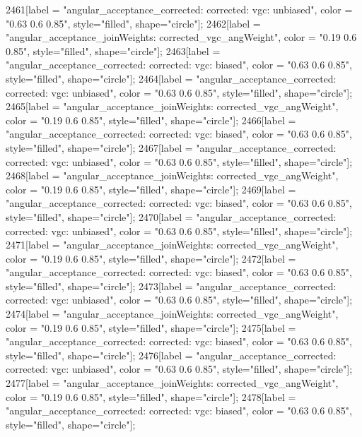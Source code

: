 {	2461[label = "angular_acceptance_corrected\nangacc: corrected\ncsp: vgc\ntrigger: unbiased", color = "0.63 0.6 0.85", style="filled", shape="circle"];
	2462[label = "angular_acceptance_joinWeights\nwflag: corrected_vgc_angWeight", color = "0.19 0.6 0.85", style="filled", shape="circle"];
	2463[label = "angular_acceptance_corrected\nangacc: corrected\ncsp: vgc\ntrigger: biased", color = "0.63 0.6 0.85", style="filled", shape="circle"];
	2464[label = "angular_acceptance_corrected\nangacc: corrected\ncsp: vgc\ntrigger: unbiased", color = "0.63 0.6 0.85", style="filled", shape="circle"];
	2465[label = "angular_acceptance_joinWeights\nwflag: corrected_vgc_angWeight", color = "0.19 0.6 0.85", style="filled", shape="circle"];
	2466[label = "angular_acceptance_corrected\nangacc: corrected\ncsp: vgc\ntrigger: biased", color = "0.63 0.6 0.85", style="filled", shape="circle"];
	2467[label = "angular_acceptance_corrected\nangacc: corrected\ncsp: vgc\ntrigger: unbiased", color = "0.63 0.6 0.85", style="filled", shape="circle"];
	2468[label = "angular_acceptance_joinWeights\nwflag: corrected_vgc_angWeight", color = "0.19 0.6 0.85", style="filled", shape="circle"];
	2469[label = "angular_acceptance_corrected\nangacc: corrected\ncsp: vgc\ntrigger: biased", color = "0.63 0.6 0.85", style="filled", shape="circle"];
	2470[label = "angular_acceptance_corrected\nangacc: corrected\ncsp: vgc\ntrigger: unbiased", color = "0.63 0.6 0.85", style="filled", shape="circle"];
	2471[label = "angular_acceptance_joinWeights\nwflag: corrected_vgc_angWeight", color = "0.19 0.6 0.85", style="filled", shape="circle"];
	2472[label = "angular_acceptance_corrected\nangacc: corrected\ncsp: vgc\ntrigger: biased", color = "0.63 0.6 0.85", style="filled", shape="circle"];
	2473[label = "angular_acceptance_corrected\nangacc: corrected\ncsp: vgc\ntrigger: unbiased", color = "0.63 0.6 0.85", style="filled", shape="circle"];
	2474[label = "angular_acceptance_joinWeights\nwflag: corrected_vgc_angWeight", color = "0.19 0.6 0.85", style="filled", shape="circle"];
	2475[label = "angular_acceptance_corrected\nangacc: corrected\ncsp: vgc\ntrigger: biased", color = "0.63 0.6 0.85", style="filled", shape="circle"];
	2476[label = "angular_acceptance_corrected\nangacc: corrected\ncsp: vgc\ntrigger: unbiased", color = "0.63 0.6 0.85", style="filled", shape="circle"];
	2477[label = "angular_acceptance_joinWeights\nwflag: corrected_vgc_angWeight", color = "0.19 0.6 0.85", style="filled", shape="circle"];
	2478[label = "angular_acceptance_corrected\nangacc: corrected\ncsp: vgc\ntrigger: biased", color = "0.63 0.6 0.85", style="filled", shape="circle"];
}
